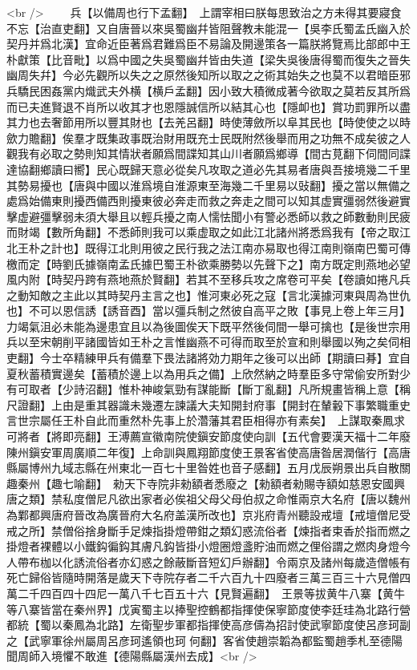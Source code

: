 <br />
　　兵【以備周也行下孟翻】　上謂宰相曰朕每思致治之方未得其要寢食不忘【治直吏翻】又自唐晉以來吳蜀幽幷皆阻聲教未能混一【吳李氏蜀孟氏幽入於契丹并爲北漢】宜命近臣著爲君難爲臣不易論及開邊策各一篇朕將覽焉比部郎中王朴獻策【比音毗】以爲中國之失吳蜀幽幷皆由失道【梁失吳後唐得蜀而復失之晉失幽周失幷】今必先觀所以失之之原然後知所以取之之術其始失之也莫不以君暗臣邪兵驕民困姦黨内熾武夫外横【横戶孟翻】因小致大積微成著今欲取之莫若反其所爲而已夫進賢退不肖所以收其才也恩隱誠信所以結其心也【隱卹也】賞功罰罪所以盡其力也去奢節用所以豐其財也【去羌呂翻】時使薄斂所以阜其民也【時使使之以時歛力贍翻】俟羣才既集政事既治財用既充士民既附然後舉而用之功無不成矣彼之人觀我有必取之勢則知其情狀者願爲間諜知其山川者願爲鄉導【間古莧翻下伺間同諜達協翻鄉讀曰嚮】民心既歸天意必從矣凡攻取之道必先其易者唐與吾接境幾二千里其勢易擾也【唐與中國以淮爲境自淮源東至海幾二千里易以䜴翻】擾之當以無備之處爲始備東則擾西備西則擾東彼必奔走而救之奔走之間可以知其虚實彊弱然後避實擊虚避彊擊弱未須大舉且以輕兵擾之南人懦怯聞小有警必悉師以救之師數動則民疲而財竭【數所角翻】不悉師則我可以乘虚取之如此江北諸州將悉爲我有【帝之取江北王朴之計也】既得江北則用彼之民行我之法江南亦易取也得江南則嶺南巴蜀可傳檄而定【時劉氏據嶺南孟氏據巴蜀王朴欲乘勝勢以先聲下之】南方既定則燕地必望風内附【時契丹跨有燕地燕於賢翻】若其不至移兵攻之席卷可平矣【卷讀如捲凡兵之動知敵之主此以其時契丹主言之也】惟河東必死之寇【言北漢據河東與周為世仇也】不可以恩信誘【誘音酉】當以彊兵制之然彼自高平之敗【事見上卷上年三月】力竭氣沮必未能為邊患宜且以為後圖俟天下既平然後伺間一舉可擒也【是後世宗用兵以至宋朝削平諸國皆如王朴之言惟幽燕不可得而取至於宣和則舉國以殉之矣伺相吏翻】今士卒精練甲兵有備羣下畏法諸將効力期年之後可以出師【期讀曰朞】宜自夏秋蓄積實邊矣【蓄積於邊上以為用兵之備】上欣然納之時羣臣多守常偷安所對少有可取者【少詩沼翻】惟朴神峻氣勁有謀能斷【斷丁亂翻】凡所規畫皆稱上意【稱尺證翻】上由是重其器識未幾遷左諫議大夫知開封府事【開封在輦轂下事繁職重史言世宗屬任王朴自此而重然朴先事上於濳藩其君臣相得亦有素矣】　上謀取秦鳳求可將者【將即亮翻】王溥薦宣徽南院使鎭安節度使向訓【五代會要漢天福十二年廢陳州鎭安軍周廣順二年復】上命訓與鳳翔節度使王景客省使高唐昝居潤偕行【高唐縣屬博州九域志縣在州東北一百七十里昝姓也音子感翻】五月戊辰朔景出兵自散關趣秦州【趣七喻翻】　勑天下寺院非勑額者悉廢之【勑額者勑賜寺額如慈恩安國興唐之類】禁私度僧尼凡欲出家者必俟祖父母父母伯叔之命惟兩京大名府【唐以魏州為鄴都興唐府晉改為廣晉府大名府盖漢所改也】京兆府青州聽設戒壇【戒壇僧尼受戒之所】禁僧俗捨身斷手足煉指掛燈帶鉗之類幻惑流俗者【煉指者束香於指而燃之掛燈者裸體以小鐵鈎徧鈎其膚凡鈎皆掛小燈圈燈盞貯油而燃之俚俗謂之燃肉身燈今人帶布枷以化誘流俗者亦幻惑之餘蔽斷音短幻戶辦翻】令兩京及諸州每歲造僧帳有死亡歸俗皆隨時開落是歲天下寺院存者二千六百九十四廢者三萬三百三十六見僧四萬二千四百四十四尼一萬八千七百五十六【見賢遍翻】　王景等拔黄牛八寨【黄牛等八寨皆當在秦州界】戊寅蜀主以捧聖控鶴都指揮使保寧節度使李廷珪為北路行營都統【蜀以秦鳳為北路】左衛聖步軍都指揮使高彦儔為招討使武寧節度使呂彦珂副之【武寧軍徐州屬周呂彦珂遙領也珂何翻】客省使趙崇韜為都監蜀趙季札至德陽聞周師入境懼不敢進【德陽縣屬漢州去成】<br />
